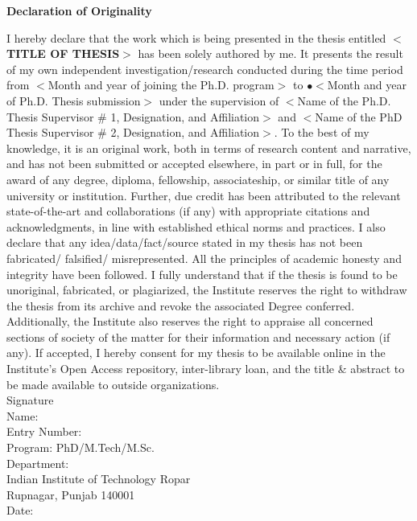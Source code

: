 




\begin{center}
{\LARGE \textbf{Declaration of Originality}}
\end{center}


I hereby declare that the work which is being presented in the thesis entitled \textbf{$<$TITLE OF THESIS$>$} has been solely authored by me. It presents the result of my own independent investigation/research conducted during the time period from $<$Month and year of joining the Ph.D. program$>$ to $•<$Month and year of Ph.D. Thesis submission$>$ under the supervision of $<$Name of the Ph.D. Thesis Supervisor \# 1, Designation, and Affiliation$>$ and $<$Name of the PhD Thesis Supervisor \# 2, Designation, and Affiliation$>$. To the best of my knowledge, it is an original work, both in terms of research content and narrative, and has not been submitted or accepted elsewhere, in part or in full, for the award of any degree, diploma, fellowship, associateship, or similar title of any university or institution. Further, due credit has been attributed to the relevant state-of-the-art and collaborations (if any) with appropriate citations and acknowledgments, in line with established ethical norms and practices. I also declare that any idea/data/fact/source stated in my thesis has not been fabricated/ falsified/ misrepresented. All the principles of academic honesty and integrity have been followed. I fully understand that if the thesis is found to be unoriginal, fabricated, or plagiarized, the Institute reserves the right to withdraw the thesis from its archive and revoke the associated Degree conferred. Additionally, the Institute also reserves the right to appraise all concerned sections of society of the matter for their information and necessary action (if any). If accepted, I hereby consent for my thesis to be available online in the Institute’s Open Access repository, inter-library loan, and the title \& abstract to be made available to outside organizations.\\[1 cm]



Signature\\

Name: \\
Entry Number: \\
Program: PhD/M.Tech/M.Sc. \\
Department: \\
Indian Institute of Technology Ropar \\
Rupnagar, Punjab 140001 \\

Date:


\newpage

